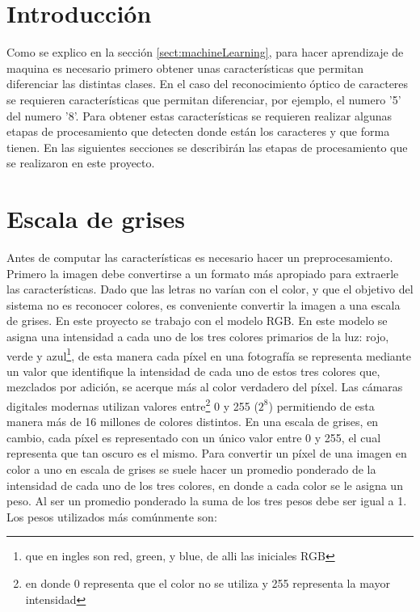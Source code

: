 \documentclass[a4paper, 11pt, oneside]{report}
\begin{document}
\section{Introducción}

Como se explico en la sección \ref{sect:machineLearning}, para hacer aprendizaje de maquina es necesario primero obtener unas características que permitan diferenciar las distintas clases. En el caso del reconocimiento óptico de caracteres se requieren características que permitan diferenciar, por ejemplo, el numero '5' del numero '8'. Para obtener estas características se requieren realizar algunas etapas de procesamiento que detecten donde están los caracteres y que forma tienen. En las siguientes secciones se describirán las etapas de procesamiento que se realizaron en este proyecto.

\section{Escala de grises}

Antes de computar las características es necesario hacer un preprocesamiento. Primero la imagen debe convertirse a un formato más apropiado para extraerle las características. Dado que las letras no varían con el color, y que el objetivo del sistema no es reconocer colores, es conveniente convertir la imagen a una escala de grises. En este proyecto se trabajo con el modelo RGB. En este modelo se asigna una intensidad a cada uno de los tres colores primarios de la luz: rojo, verde y azul\footnote{que en ingles son red, green, y blue, de alli las iniciales RGB}, de esta manera cada píxel en una fotografía se representa mediante un valor que identifique la intensidad de cada uno de estos tres colores que, mezclados por adición, se acerque más al color verdadero del píxel. Las cámaras digitales modernas utilizan valores entre\footnote{en donde 0 representa que el color no se utiliza y 255 representa la mayor intensidad} 0 y 255 ($2^8$) permitiendo de esta manera más de 16 millones de colores distintos. En una escala de grises, en cambio, cada píxel es representado con un único valor entre 0 y 255, el cual representa que tan oscuro es el mismo. Para convertir un píxel de una imagen en color a uno en escala de grises se suele hacer un promedio ponderado de la intensidad de cada uno de los tres colores, en donde a cada color se le asigna un peso. Al ser un promedio ponderado la suma de los tres pesos debe ser igual a 1. Los pesos utilizados más comúnmente son:
\end{document}
